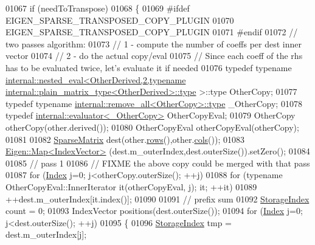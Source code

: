 \begin{DoxyCode}
01067   \textcolor{keywordflow}{if} (needToTranspose)
01068   \{
01069 \textcolor{preprocessor}{    #ifdef EIGEN\_SPARSE\_TRANSPOSED\_COPY\_PLUGIN}
01070       EIGEN\_SPARSE\_TRANSPOSED\_COPY\_PLUGIN
01071 \textcolor{preprocessor}{    #endif}
01072     \textcolor{comment}{// two passes algorithm:}
01073     \textcolor{comment}{//  1 - compute the number of coeffs per dest inner vector}
01074     \textcolor{comment}{//  2 - do the actual copy/eval}
01075     \textcolor{comment}{// Since each coeff of the rhs has to be evaluated twice, let's evaluate it if needed}
01076     \textcolor{keyword}{typedef} \textcolor{keyword}{typename} 
      \hyperlink{struct_eigen_1_1internal_1_1nested__eval}{internal::nested\_eval<OtherDerived,2,typename internal::plain\_matrix\_type<OtherDerived>::type}
       >::type OtherCopy;
01077     \textcolor{keyword}{typedef} \textcolor{keyword}{typename} \hyperlink{group___sparse_core___module}{internal::remove\_all<OtherCopy>::type} \_OtherCopy;
01078     \textcolor{keyword}{typedef} \hyperlink{struct_eigen_1_1internal_1_1evaluator}{internal::evaluator<\_OtherCopy>} OtherCopyEval;
01079     OtherCopy otherCopy(other.derived());
01080     OtherCopyEval otherCopyEval(otherCopy);
01081 
01082     \hyperlink{group___sparse_core___module_class_eigen_1_1_sparse_matrix}{SparseMatrix} dest(other.\hyperlink{group___sparse_core___module_a1944e9fa9ce7937bfc3a87b2cb94371f}{rows}(),other.\hyperlink{group___sparse_core___module_aca7ce296424ef6e478ab0fb19547a7ee}{cols}());
01083     \hyperlink{group___core___module_class_eigen_1_1_map}{Eigen::Map<IndexVector>} (dest.m\_outerIndex,dest.outerSize()).setZero();
01084 
01085     \textcolor{comment}{// pass 1}
01086     \textcolor{comment}{// FIXME the above copy could be merged with that pass}
01087     \textcolor{keywordflow}{for} (\hyperlink{group___core___module_a554f30542cc2316add4b1ea0a492ff02}{Index} j=0; j<otherCopy.outerSize(); ++j)
01088       \textcolor{keywordflow}{for} (\textcolor{keyword}{typename} OtherCopyEval::InnerIterator it(otherCopyEval, j); it; ++it)
01089         ++dest.m\_outerIndex[it.index()];
01090 
01091     \textcolor{comment}{// prefix sum}
01092     \hyperlink{group___sparse_core___module_a0b540ba724726ebe953f8c0df06081ed}{StorageIndex} count = 0;
01093     IndexVector positions(dest.outerSize());
01094     \textcolor{keywordflow}{for} (\hyperlink{group___core___module_a554f30542cc2316add4b1ea0a492ff02}{Index} j=0; j<dest.outerSize(); ++j)
01095     \{
01096       \hyperlink{group___sparse_core___module_a0b540ba724726ebe953f8c0df06081ed}{StorageIndex} tmp = dest.m\_outerIndex[j];

\end{DoxyCode}

